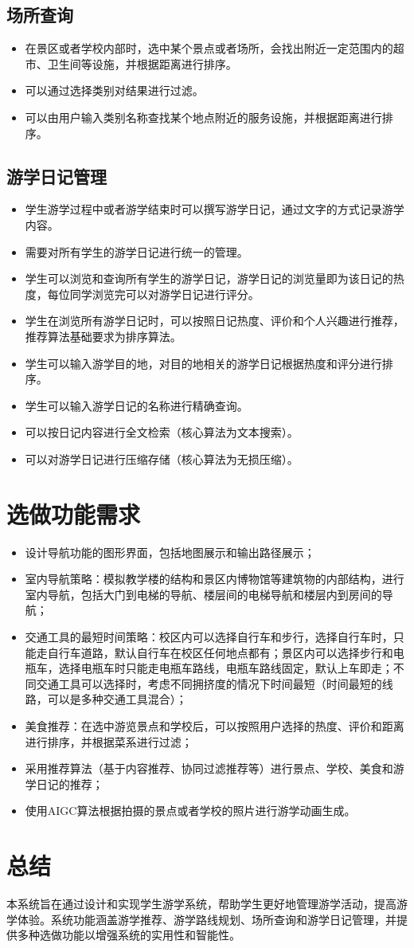 \documentclass[a4paper, 12pt]{ctexart}
\begin{document}
\subsection{场所查询}
\begin{itemize}
    \item 在景区或者学校内部时，选中某个景点或者场所，会找出附近一定范围内的超市、卫生间等设施，并根据距离进行排序。
    \item 可以通过选择类别对结果进行过滤。
    \item 可以由用户输入类别名称查找某个地点附近的服务设施，并根据距离进行排序。
\end{itemize}

\subsection{游学日记管理}
\begin{itemize}
    \item 学生游学过程中或者游学结束时可以撰写游学日记，通过文字的方式记录游学内容。
    \item 需要对所有学生的游学日记进行统一的管理。
    \item 学生可以浏览和查询所有学生的游学日记，游学日记的浏览量即为该日记的热度，每位同学浏览完可以对游学日记进行评分。
    \item 学生在浏览所有游学日记时，可以按照日记热度、评价和个人兴趣进行推荐，推荐算法基础要求为排序算法。
    \item 学生可以输入游学目的地，对目的地相关的游学日记根据热度和评分进行排序。
    \item 学生可以输入游学日记的名称进行精确查询。
    \item 可以按日记内容进行全文检索（核心算法为文本搜索）。
    \item 可以对游学日记进行压缩存储（核心算法为无损压缩）。
\end{itemize}

\section{选做功能需求}
\begin{itemize}
    \item 设计导航功能的图形界面，包括地图展示和输出路径展示；
    \item 室内导航策略：模拟教学楼的结构和景区内博物馆等建筑物的内部结构，进行室内导航，包括大门到电梯的导航、楼层间的电梯导航和楼层内到房间的导航；
    \item 交通工具的最短时间策略：校区内可以选择自行车和步行，选择自行车时，只能走自行车道路，默认自行车在校区任何地点都有；景区内可以选择步行和电瓶车，选择电瓶车时只能走电瓶车路线，电瓶车路线固定，默认上车即走；不同交通工具可以选择时，考虑不同拥挤度的情况下时间最短（时间最短的线路，可以是多种交通工具混合）；
    \item 美食推荐：在选中游览景点和学校后，可以按照用户选择的热度、评价和距离进行排序，并根据菜系进行过滤；
    \item 采用推荐算法（基于内容推荐、协同过滤推荐等）进行景点、学校、美食和游学日记的推荐；
    \item 使用AIGC算法根据拍摄的景点或者学校的照片进行游学动画生成。
\end{itemize}

\section{总结}
本系统旨在通过设计和实现学生游学系统，帮助学生更好地管理游学活动，提高游学体验。系统功能涵盖游学推荐、游学路线规划、场所查询和游学日记管理，并提供多种选做功能以增强系统的实用性和智能性。
\end{document}
